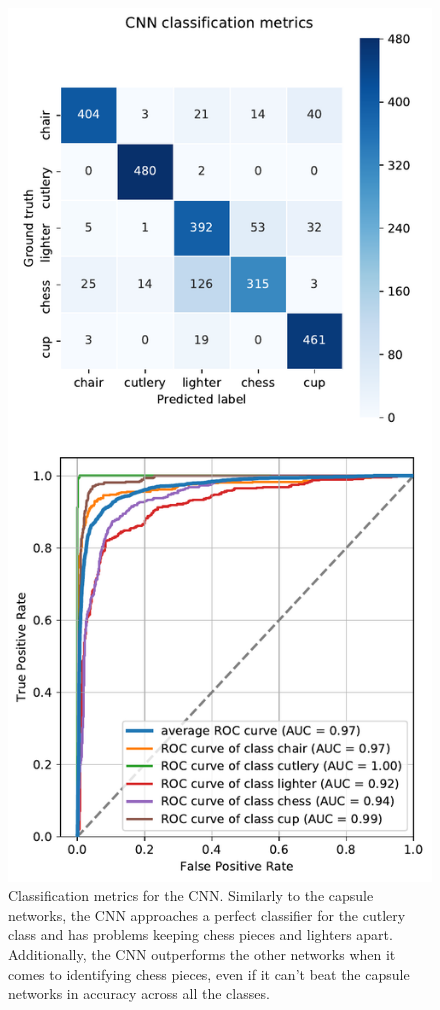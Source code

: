 \begin{figure}[H]
    \centering
\includegraphics[width=.59\textwidth]{figures/roc_cnn.pdf}
\caption[Classification metrics for the CNN]{Classification metrics for the CNN. Similarly to the capsule networks, the CNN approaches a perfect classifier for the cutlery class and has problems keeping chess pieces and lighters apart. Additionally, the CNN outperforms the other networks when it comes to identifying chess pieces, even if it can't beat the capsule networks in accuracy across all the classes.}\label{fig:roc-cnn}
\end{figure}\noindent
